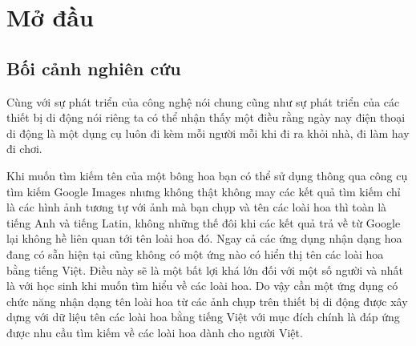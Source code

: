 \documentclass[12pt]{report}
\begin{document}
		\newpage
		\setcounter{page}{1}
		\chapter{Mở đầu}
		\label{chap:intro}
																																																																										
		\section*{Bối cảnh nghiên cứu}
																																																																										
		Cùng với sự phát triển của công nghệ nói chung cũng như sự phát triển của các thiết bị di động nói riêng ta có thể nhận thấy một điều rằng ngày nay điện thoại di động là một dụng cụ luôn đi kèm mỗi người mỗi khi đi ra khỏi nhà, đi làm hay đi chơi. 
		
		Khi muốn tìm kiếm tên của một bông hoa bạn có thể sử dụng thông qua công cụ tìm kiếm Google Images nhưng không thật không may các kết quả tìm kiếm chỉ là các hình ảnh tương tự với ảnh mà bạn chụp và tên các loài hoa thì toàn là tiếng Anh và tiếng Latin, không những thế đôi khi các kết quả trả về từ Google lại không hề liên quan tới tên loài hoa đó. 
		Ngay cả các ứng dụng nhận dạng hoa đang có sẵn hiện tại cũng không có một ứng nào có hiển thị tên các loài hoa bằng tiếng Việt.
		Điều này sẽ là một bất lợi khá lớn đối với một số người và nhất là với học sinh khi muốn tìm hiểu về các loài hoa.
		Do vậy cần một ứng dụng có chức năng nhận dạng tên loài hoa từ các ảnh chụp trên thiết bị di động được xây dựng với dữ liệu tên các loài hoa bằng tiếng Việt
		với mục đích chính là đáp ứng được nhu cầu tìm kiếm về các loài hoa dành cho người Việt.		
		\newpage
																																																																										
\end{document}
